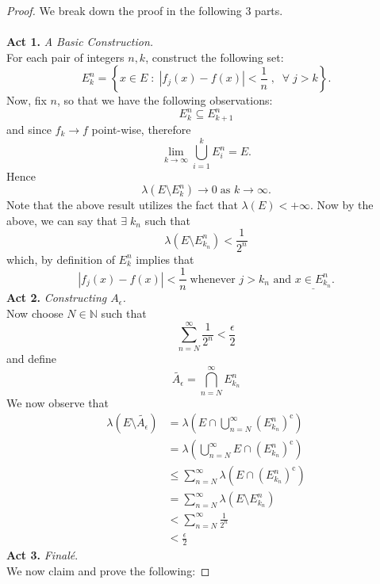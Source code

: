 \documentclass{article}
\theoremstyle{definition}
\theoremstyle{remark}
\theoremstyle{definition}
\theoremstyle{definition}
\theoremstyle{definition}
\newcommand{\abs}[1]{\left \vert #1\right \vert}
\newcommand{\intrs}{\cap}
\newcommand{\bunion}{\bigcup}
\newcommand{\bintrs}{\bigcap}
\newcommand{\N}{\mathbb{N}}
\newcommand{\comp}[1]{#1^{\text{c}}}
\newcommand{\lm}[1]{\lambda\left (#1\right )}
\begin{document}
\begin{proof} We break down the proof in the following 3 parts.\\\\
	\textbf{Act 1.} \emph{A Basic Construction.}\\
	 For each pair of integers $ n,k $, construct the following set:
	\[E^{n}_k = \left \{x\in E\;:\; \abs{f_j(x) - f(x)} < \frac{1}{n}\;,\;\;\forall\; j>k\right \}.\]
	Now, fix $ n $, so that we have the following observations:
	\begin{equation}
		\label{T-3.1}
		E_k^{n} \subseteq E_{k+1}^{n}
	\end{equation}
	and since $ f_k \longrightarrow  f$ point-wise, therefore 
\begin{equation}
	\label{T-3.2}
	\lim_{k\to \infty}\bunion_{i=1}^{k}E_i^{n} = E.
\end{equation}
Hence 
\[\lm{E\setminus E_k^{n}} \longrightarrow 0 \;\text{as } k\to \infty.\]
Note that the above result utilizes the fact that $ \lm{E} < +\infty $. Now by the above, we can say that $ \exists\; k_n $ such that 
\[\lm{E\setminus E_{k_n}^{n}} < \frac{1}{2^n}\]
which, by definition of $ E_k^{n} $ implies that 
\[\abs{f_j(x) - f(x)} < \frac{1}{n}\;\text{whenever }j> k_n\text{ and } \underline{x\in E^{n}_{k_n}}.\]
\textbf{Act 2.} \emph{Constructing $ A_\epsilon $.} \\
Now choose $ N \in \N $ such that
\[\sum_{n=N}^{\infty} \frac{1}{2^n} < \frac{\epsilon}{2}\]
and define
\begin{equation}
	\tilde{A_\epsilon} = \bintrs_{n=N}^{\infty} E_{k_n}^{n}
\end{equation}
We now observe that
\begin{equation*}
	\begin{split}
		\lm{E\setminus \tilde{A_{\epsilon}}} &= \lm{E \intrs \bunion_{n=N}^{\infty}\comp{\left (E_{k_n}^{n}\right )}}\\
		&= \lm{ \bunion_{n=N}^{\infty}E \intrs \comp{\left (E_{k_n}^{n}\right )}}\\
		&\le \sum_{n=N}^{\infty} \lm{E\intrs \comp{\left (E_{k_n}^{n}\right )}}\\
		&= \sum_{n=N}^{\infty} \lm{E\setminus E_{k_n}^{n}}\\
		&<\sum_{n=N}^{\infty} \frac{1}{2^n}\\
		&< \frac{\epsilon}{2}
	\end{split}
\end{equation*}
\textbf{Act 3.} \emph{Final\'e}.\\
We now claim and prove the following: 

\end{proof}
\end{document}
